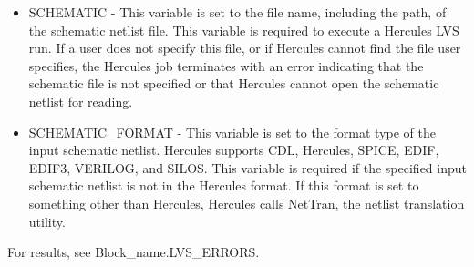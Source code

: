 \documentclass[a4paper,12pt,twoside]{article}
\begin{document}
\begin{enumerate}
\begin{itemize}
        \item SCHEMATIC - This variable is set to the file name, including the path, of the schematic netlist file. This variable is required to execute a Hercules LVS run. If a user does not specify this file, or if Hercules cannot find the file user specifies, the Hercules job terminates with an error indicating that the schematic file is not specified or that Hercules cannot open the schematic netlist for reading.
        \item SCHEMATIC\_FORMAT - This variable is set to the format type of the input schematic netlist. Hercules supports CDL, Hercules, SPICE, EDIF, EDIF3, VERILOG, and SILOS. This variable is required if the specified input schematic netlist is not in the Hercules format. If this format is set to something other than Hercules, Hercules calls NetTran, the netlist translation utility.
    \end{itemize}
    For results, see Block\_name.LVS\_ERRORS.
\end{enumerate}
\end{document}
